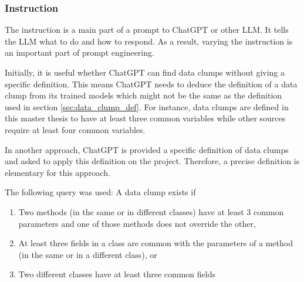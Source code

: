 \begin{comment}
In this section, the results of some of these experiments will be discussed.  As repeatedly noted, these experiments are not always reproducible and therefore are only to some extent helpful. In all cases, ChatGPT is asked to output in \ac{JSON} to have a consistent format.

In each experiment, different parameters of the input are adjusted. Each these parameters has an influence of the quality of the output:

\begin{itemize}
    \item Instruction
    \item Model
    \item Data format
    \item Data size
    \item Temperature
\end{itemize}
\end{comment}
\subsubsection{Instruction}\label{sec:llm_instruction}
The instruction is a main part of a prompt to ChatGPT or other \ac{LLM}. It tells the  \ac{LLM} what to do and how to respond. As a result, varying the instruction is an important part of prompt engineering. \newline



Initially, it is useful whether ChatGPT can find data clumps without giving a specific definition. This means ChatGPT needs to deduce the definition of a data clump from its trained models which might not be the same as the definition used in section \ref{sec:data_clump_def}. For instance, data clumps are defined in this master thesis to have at least three common variables while other sources require at least four common variables. 
\begin{comment}
Nevertheless, the results are fairly good. ChatGPT ignores the inheritance between \textit{MathStuff} and \textit{BetterMathStuff} and does not output a data clump for each method in \textit{MathStuff}
\end{comment}


In another approach, ChatGPT is provided a specific definition of data clumps and asked to apply this definition on the project. Therefore, a precise definition is elementary for this approach.

The following query was used:
A data clump exists if
\begin{enumerate}
\item  Two methods (in the same or in different classes) have at least 3 common parameters
    and one of those methods does not override the other, 
\item At least three fields in a class are common with the parameters of a method (in the same or in a different class), or 
\item Two different classes have at least three common fields
\end{enumerate}


